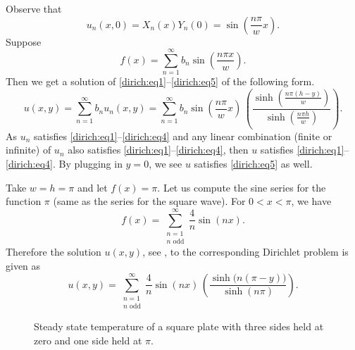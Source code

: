 Observe that
\begin{equation*}
u_n(x,0) = X_n(x)Y_n(0) = \sin \left( \frac{n \pi}{w} x \right) .
\end{equation*}
Suppose
\begin{equation*}
f(x) =
\sum_{n=1}^\infty
b_n \sin \left( \frac{n \pi x }{w} \right) .
\end{equation*}
Then we get a solution of \eqref{dirich:eq1}--\eqref{dirich:eq5} of the
following form.
\begin{equation*}
\boxed{
~~
u(x,y) =
\sum_{n=1}^\infty
b_n u_n(x,y)
=
\sum_{n=1}^\infty
b_n 
\sin \left( \frac{n \pi}{w} x \right)
\, \left( \frac{\sinh \left( \frac{n \pi (h-y) }{w} \right)}%
{\sinh \left( \frac{n \pi h }{w} \right)} \right)
.
~~
}
\end{equation*}
As $u_n$ satisfies \eqref{dirich:eq1}--\eqref{dirich:eq4} and any linear
combination (finite or infinite) of $u_n$ also satisfies 
\eqref{dirich:eq1}--\eqref{dirich:eq4}, then $u$ satisfies
\eqref{dirich:eq1}--\eqref{dirich:eq4}.
By plugging in $y=0$, we see $u$
satisfies 
\eqref{dirich:eq5} as well.

\begin{example}
Take $w=h=\pi$ and let $f(x) = \pi$.  Let us compute the sine
series for the function $\pi$ (same as the series for the square wave).
For $0 < x < \pi$, we have
\begin{equation*}
f(x) =
\sum_{\substack{n=1 \\ n \text{ odd}}}^\infty
\frac{4}{n}
\sin (n x) .
\end{equation*}
Therefore the solution $u(x,y)$, see ,
to the corresponding Dirichlet problem is
given as
\begin{equation*}
u(x,y) =
\sum_{\substack{n=1 \\ n \text{ odd}}}^\infty
\frac{4}{n}
\sin (n x)
\,\left( \frac{\sinh \bigl( n (\pi-y) \bigr) }{\sinh (n \pi)} \right)
.
\end{equation*}

\begin{figure}[h!t]
\capstart
\begin{center}
\caption{Steady state temperature of a square plate with three sides
held at zero and one side held at $\pi$.\label{dirichsquareplot:fig}}
\end{center}
\end{figure}
\end{example}


